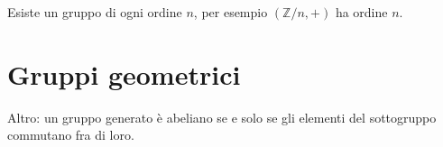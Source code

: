\documentclass[a4paper]{article}
\begin{document}
Esiste un gruppo di ogni ordine \(n\), per esempio \((\mathbb{Z} / n, +)\) ha ordine \(n\).

\pagebreak

\section{Gruppi geometrici}







Altro: un gruppo generato è abeliano se e solo se gli elementi del
sottogruppo commutano fra di loro.



%
%
%
%
%
%
%
%
%
\end{document}
